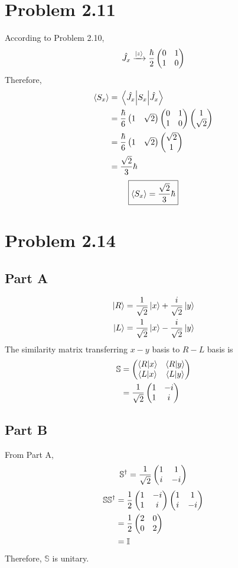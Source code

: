 \documentclass{article}
\begin{document}
\section*{Problem 2.11}
According to Problem 2.10, 
\[
  \hat{J_x} \basexp{z} \frac{\hbar}{2} \pmqty{0 & 1 \\ 1 & 0}
\]
Therefore, 
\[ 
  \begin{split}
    \expval{S_x} &= \expval{S_x}{\hat{J_x}} \\
    &= \frac{\hbar}{6} \pmqty{1 & \sqrt{2}} \pmqty{\admat[0]{1, 1}} \pmqty{1 \\ \sqrt{2}} \\
    &= \frac{\hbar}{6} \pmqty{1 & \sqrt{2}} \pmqty{\sqrt{2} \\ 1} \\
    &= \frac{\sqrt{2}}{3} \hbar 
  \end{split}  
\]
\[ 
  \boxed{
    \expval{S_x} = \frac{\sqrt{2}}{3} \hbar 
  }
\]

\section*{Problem 2.14}
\subsection*{Part A}
\begin{align*}
  \ket{R} &= \frac{1}{\sqrt{2}} \ket{x} + \frac{i}{\sqrt{2}} \ket{y} \\
  \ket{L} &= \frac{1}{\sqrt{2}} \ket{x} - \frac{i}{\sqrt{2}} \ket{y}
\end{align*}
The similarity matrix transferring $x-y$ basis to $R-L$ basis is 
\[ 
  \begin{split}
    \mathbb{S} &= \sm{R}{L}{x}{y} \\
  &= \frac{1}{\sqrt{2}} \pmqty{1 & -i \\ 1 & i}
  \end{split}
\]
\subsection*{Part B}
From Part A,
\[ 
  \mathbb{S}^{\dagger} = \frac{1}{\sqrt{2}} \pmqty{1 & 1 \\ i & -i} 
\]
\[ 
  \begin{split}
  \mathbb{S} \mathbb{S}^{\dagger} 
  &= \frac{1}{2} \pmqty{1 & -i \\ 1 & i} \pmqty{1 & 1 \\ i & -i}\\
  &= \frac{1}{2} \pmqty{\dmat[0]{2,2}} \\
  &= \mathbb{I}
  \end{split}
\]
Therefore, $\mathbb{S}$ is unitary. 
\end{document}
